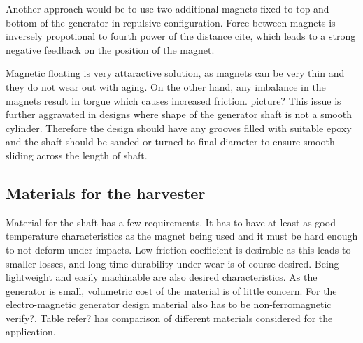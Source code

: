 Another approach would be to use two additional magnets fixed to top and bottom of the generator in repulsive configuration. Force between magnets is inversely propotional to fourth power of the distance {\color{red} cite}, which leads to a strong negative feedback on the position of the magnet. 

Magnetic floating is very attaractive solution, as magnets can be very thin and they do not wear out with aging. On the other hand, any imbalance in the magnets result in torgue which causes increased friction. {\color{yellow} picture?} This issue is further aggravated in designs where shape of the generator shaft is not a smooth cylinder. Therefore the design should have any grooves filled with suitable epoxy and the shaft should be sanded or turned to final diameter to ensure smooth sliding across the length of shaft.

\subsection{Materials for the harvester}
Material for the shaft has a few requirements. It has to have at least as good temperature characteristics as the magnet being used and it must be hard enough to not deform under impacts. Low friction coefficient is desirable as this leads to smaller losses, and long time durability under wear is of course desired. Being lightweight and easily machinable are also desired characteristics. As the generator is small, volumetric cost of the material is of little concern. For the electro-magnetic generator design material also has to be non-ferromagnetic {\color{red} verify?}. Table {\color{yellow} refer?} has comparison of different materials considered for the application.

\begin{table}[htb]
\caption{\label{parameters_of_materials} Materials for the shaft of generator}
\begin{center}
\end{center}
\end{table}

